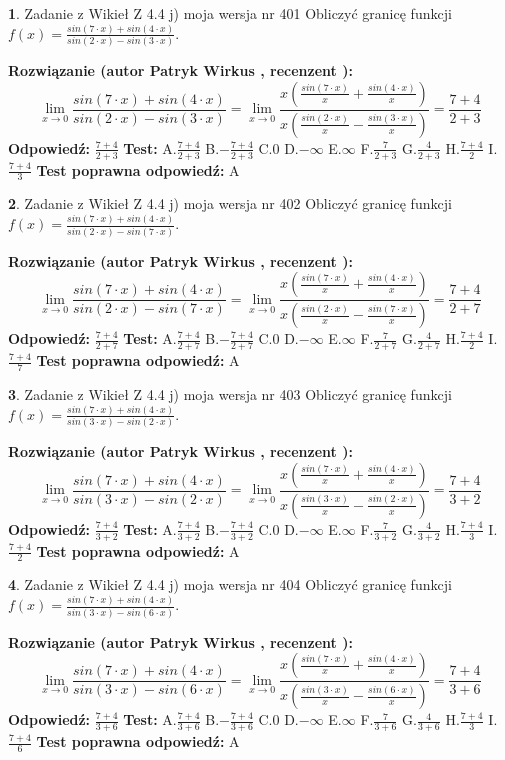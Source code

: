 \documentclass[12pt, a4paper]{article}
\theoremstyle{definition} %
\newtheorem{zad}{}
\newcommand{\zadStart}[1]{\begin{zad}#1\newline}
\newcommand{\zadStop}{\end{zad}}
\newcommand{\rozwStart}[2]{\noindent \textbf{Rozwiązanie (autor #1 , recenzent #2): }\newline}
\newcommand{\rozwStop}{\newline}
\newcommand{\odpStart}{\noindent \textbf{Odpowiedź:}\newline}
\newcommand{\odpStop}{\newline}
\newcommand{\testStart}{\noindent \textbf{Test:}\newline}
\newcommand{\testStop}{\newline}
\newcommand{\kluczStart}{\noindent \textbf{Test poprawna odpowiedź:}\newline}
\newcommand{\kluczStop}{\newline}
\begin{document}
\zadStart{Zadanie z Wikieł Z 4.4 j) moja wersja nr 401}
Obliczyć granicę funkcji $f(x)=\frac{sin(7\cdot x) +sin(4\cdot x)}{sin(2\cdot x) -sin(3\cdot x)}$.
\zadStop
\rozwStart{Patryk Wirkus}{}
$$\lim\limits_{x\to 0}\frac{sin(7\cdot x) +sin(4\cdot x)}{sin(2\cdot x) -sin(3\cdot x)}=\lim\limits_{x\to 0}\frac{x(\frac{sin(7\cdot x)}{x}+\frac{sin(4\cdot x)}{x})}{x(\frac{sin(2\cdot x)}{x}-\frac{sin(3\cdot x)}{x})}=\frac{7+4}{2+3}$$
\rozwStop
\odpStart
$\frac{7+4}{2+3}$
\odpStop
\testStart
A.$\frac{7+4}{2+3}$
B.$-\frac{7+4}{2+3}$
C.$0$
D.$-\infty$
E.$\infty$
F.$\frac{7}{2+3}$
G.$\frac{4}{2+3}$
H.$\frac{7+4}{2}$
I.$\frac{7+4}{3}$
\testStop
\kluczStart
A
\kluczStop



\zadStart{Zadanie z Wikieł Z 4.4 j) moja wersja nr 402}
Obliczyć granicę funkcji $f(x)=\frac{sin(7\cdot x) +sin(4\cdot x)}{sin(2\cdot x) -sin(7\cdot x)}$.
\zadStop
\rozwStart{Patryk Wirkus}{}
$$\lim\limits_{x\to 0}\frac{sin(7\cdot x) +sin(4\cdot x)}{sin(2\cdot x) -sin(7\cdot x)}=\lim\limits_{x\to 0}\frac{x(\frac{sin(7\cdot x)}{x}+\frac{sin(4\cdot x)}{x})}{x(\frac{sin(2\cdot x)}{x}-\frac{sin(7\cdot x)}{x})}=\frac{7+4}{2+7}$$
\rozwStop
\odpStart
$\frac{7+4}{2+7}$
\odpStop
\testStart
A.$\frac{7+4}{2+7}$
B.$-\frac{7+4}{2+7}$
C.$0$
D.$-\infty$
E.$\infty$
F.$\frac{7}{2+7}$
G.$\frac{4}{2+7}$
H.$\frac{7+4}{2}$
I.$\frac{7+4}{7}$
\testStop
\kluczStart
A
\kluczStop



\zadStart{Zadanie z Wikieł Z 4.4 j) moja wersja nr 403}
Obliczyć granicę funkcji $f(x)=\frac{sin(7\cdot x) +sin(4\cdot x)}{sin(3\cdot x) -sin(2\cdot x)}$.
\zadStop
\rozwStart{Patryk Wirkus}{}
$$\lim\limits_{x\to 0}\frac{sin(7\cdot x) +sin(4\cdot x)}{sin(3\cdot x) -sin(2\cdot x)}=\lim\limits_{x\to 0}\frac{x(\frac{sin(7\cdot x)}{x}+\frac{sin(4\cdot x)}{x})}{x(\frac{sin(3\cdot x)}{x}-\frac{sin(2\cdot x)}{x})}=\frac{7+4}{3+2}$$
\rozwStop
\odpStart
$\frac{7+4}{3+2}$
\odpStop
\testStart
A.$\frac{7+4}{3+2}$
B.$-\frac{7+4}{3+2}$
C.$0$
D.$-\infty$
E.$\infty$
F.$\frac{7}{3+2}$
G.$\frac{4}{3+2}$
H.$\frac{7+4}{3}$
I.$\frac{7+4}{2}$
\testStop
\kluczStart
A
\kluczStop



\zadStart{Zadanie z Wikieł Z 4.4 j) moja wersja nr 404}
Obliczyć granicę funkcji $f(x)=\frac{sin(7\cdot x) +sin(4\cdot x)}{sin(3\cdot x) -sin(6\cdot x)}$.
\zadStop
\rozwStart{Patryk Wirkus}{}
$$\lim\limits_{x\to 0}\frac{sin(7\cdot x) +sin(4\cdot x)}{sin(3\cdot x) -sin(6\cdot x)}=\lim\limits_{x\to 0}\frac{x(\frac{sin(7\cdot x)}{x}+\frac{sin(4\cdot x)}{x})}{x(\frac{sin(3\cdot x)}{x}-\frac{sin(6\cdot x)}{x})}=\frac{7+4}{3+6}$$
\rozwStop
\odpStart
$\frac{7+4}{3+6}$
\odpStop
\testStart
A.$\frac{7+4}{3+6}$
B.$-\frac{7+4}{3+6}$
C.$0$
D.$-\infty$
E.$\infty$
F.$\frac{7}{3+6}$
G.$\frac{4}{3+6}$
H.$\frac{7+4}{3}$
I.$\frac{7+4}{6}$
\testStop
\kluczStart
A
\kluczStop
\end{document}
